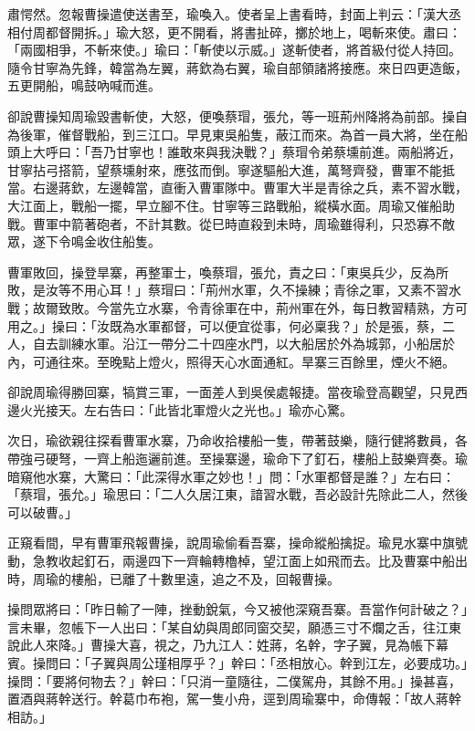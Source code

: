 肅愕然。忽報曹操遣使送書至，瑜喚入。使者呈上書看時，封面上判云：「漢大丞相付周都督開拆。」瑜大怒，更不開看，將書扯碎，擲於地上，喝斬來使。肅曰：「兩國相爭，不斬來使。」瑜曰：「斬使以示威。」遂斬使者，將首級付從人持回。隨令甘寧為先鋒，韓當為左翼，蔣欽為右翼，瑜自部領諸將接應。來日四更造飯，五更開船，鳴鼓吶喊而進。

卻說曹操知周瑜毀書斬使，大怒，便喚蔡瑁，張允，等一班荊州降將為前部。操自為後軍，催督戰船，到三江口。早見東吳船隻，蔽江而來。為首一員大將，坐在船頭上大呼曰：「吾乃甘寧也！誰敢來與我決戰？」蔡瑁令弟蔡壎前進。兩船將近，甘寧拈弓搭箭，望蔡壎射來，應弦而倒。寧遂驅船大進，萬弩齊發，曹軍不能抵當。右邊蔣欽，左邊韓當，直衝入曹軍隊中。曹軍大半是青徐之兵，素不習水戰，大江面上，戰船一擺，早立腳不住。甘寧等三路戰船，縱橫水面。周瑜又催船助戰。曹軍中箭著砲者，不計其數。從巳時直殺到未時，周瑜雖得利，只恐寡不敵眾，遂下令鳴金收住船隻。

曹軍敗回，操登旱寨，再整軍士，喚蔡瑁，張允，責之曰：「東吳兵少，反為所敗，是汝等不用心耳！」蔡瑁曰：「荊州水軍，久不操練；青徐之軍，又素不習水戰；故爾致敗。今當先立水寨，令青徐軍在中，荊州軍在外，每日教習精熟，方可用之。」操曰：「汝既為水軍都督，可以便宜從事，何必稟我？」於是張，蔡，二人，自去訓練水軍。沿江一帶分二十四座水門，以大船居於外為城郭，小船居於內，可通往來。至晚點上燈火，照得天心水面通紅。旱寨三百餘里，煙火不絕。

卻說周瑜得勝回寨，犒賞三軍，一面差人到吳侯處報捷。當夜瑜登高觀望，只見西邊火光接天。左右告曰：「此皆北軍燈火之光也。」瑜亦心驚。

次日，瑜欲親往探看曹軍水寨，乃命收拾樓船一隻，帶著鼓樂，隨行健將數員，各帶強弓硬弩，一齊上船迤邐前進。至操寨邊，瑜命下了釘石，樓船上鼓樂齊奏。瑜暗窺他水寨，大驚曰：「此深得水軍之妙也！」問：「水軍都督是誰？」左右曰：「蔡瑁，張允。」瑜思曰：「二人久居江東，諳習水戰，吾必設計先除此二人，然後可以破曹。」

正窺看間，早有曹軍飛報曹操，說周瑜偷看吾寨，操命縱船擒捉。瑜見水寨中旗號動，急教收起釘石，兩邊四下一齊輪轉櫓棹，望江面上如飛而去。比及曹寨中船出時，周瑜的樓船，已離了十數里遠，追之不及，回報曹操。

操問眾將曰：「昨日輸了一陣，挫動銳氣，今又被他深窺吾寨。吾當作何計破之？」言未畢，忽帳下一人出曰：「某自幼與周郎同窗交契，願憑三寸不爛之舌，往江東說此人來降。」曹操大喜，視之，乃九江人：姓蔣，名幹，字子翼，見為帳下幕賓。操問曰：「子翼與周公瑾相厚乎？」幹曰：「丞相放心。幹到江左，必要成功。」操問：「要將何物去？」幹曰：「只消一童隨往，二僕駕舟，其餘不用。」操甚喜，置酒與蔣幹送行。幹葛巾布袍，駕一隻小舟，逕到周瑜寨中，命傳報：「故人蔣幹相訪。」

